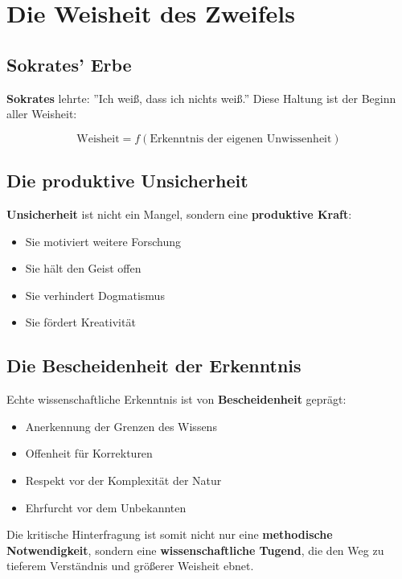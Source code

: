 \documentclass[12pt,a4paper]{report}
\begin{document}
	\section{Die Weisheit des Zweifels}
	
	\subsection{Sokrates' Erbe}
	
	\textbf{Sokrates} lehrte: ''Ich weiß, dass ich nichts weiß.'' Diese Haltung ist der Beginn aller Weisheit:
	
	\begin{equation}
		\text{Weisheit} = f(\text{Erkenntnis der eigenen Unwissenheit})
	\end{equation}
	
	\subsection{Die produktive Unsicherheit}
	
	\textbf{Unsicherheit} ist nicht ein Mangel, sondern eine \textbf{produktive Kraft}:
	
	\begin{itemize}
		\item Sie motiviert weitere Forschung
		\item Sie hält den Geist offen
		\item Sie verhindert Dogmatismus
		\item Sie fördert Kreativität
	\end{itemize}
	
	\subsection{Die Bescheidenheit der Erkenntnis}
	
	Echte wissenschaftliche Erkenntnis ist von \textbf{Bescheidenheit} geprägt:
	
	\begin{itemize}
		\item Anerkennung der Grenzen des Wissens
		\item Offenheit für Korrekturen
		\item Respekt vor der Komplexität der Natur
		\item Ehrfurcht vor dem Unbekannten
	\end{itemize}
	
	Die kritische Hinterfragung ist somit nicht nur eine \textbf{methodische Notwendigkeit}, sondern eine \textbf{wissenschaftliche Tugend}, die den Weg zu tieferem Verständnis und größerer Weisheit ebnet.
\end{document}
